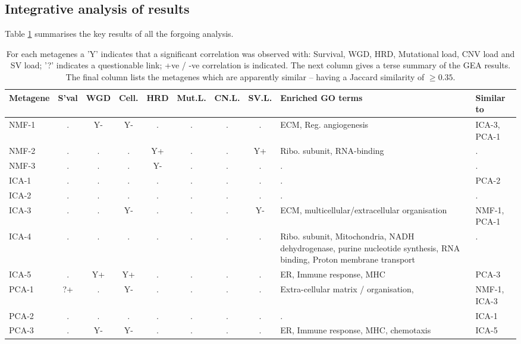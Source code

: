 \documentclass[tikz, 11pt,a4paper,oneside,fleqn]{article}
\begin{document}
\FloatBarrier

\subsection{Integrative analysis of results}
\label{sec-integrative-analysis}

Table \ref{tab-integrative-analysis} summarises the key results of all the forgoing analysis.  
 
\begin{table}[htb!]
\begin{center}
\begingroup
\scriptsize
\renewcommand{\arraystretch}{1.4} %
\begin{tabular}{|l||c|c|c|c|c|c|c|p{4.5cm}|l|}
\hline
Metagene & S'val & WGD & Cell. & HRD & Mut.L. & CN.L. & SV.L. & Enriched GO terms & Similar to\\
\hline
NMF-1 & . & Y-& Y-& . & . & . & . & ECM, Reg. angiogenesis & ICA-3, PCA-1 \\
NMF-2 & . & . & . & Y+& . & . & Y+& Ribo. subunit, RNA-binding & . \\
NMF-3 & . & . & . & Y-& . & . & . & . & . \\
\hline
ICA-1 & . & . & . & . & . & . & . & . & PCA-2 \\
ICA-2 & . & . & . & . & . & . & . & . & . \\
ICA-3 & . & . & Y-& . & . & . & Y-& ECM, multicellular/extracellular organisation & NMF-1, PCA-1 \\
ICA-4 & . & . & . & . & . & . & . & Ribo. subunit, Mitochondria, NADH dehydrogenase, purine nucleotide synthesis, RNA binding, Proton membrane transport & . \\
ICA-5 & . & Y+& Y+& . & . & . & . & ER, Immune response, MHC & PCA-3 \\
\hline
PCA-1 & ?+& . & Y-& . & . & . & . & Extra-cellular matrix / organisation, & NMF-1, ICA-3 \\
PCA-2 & . & . & . & . & . & . & . & . & ICA-1 \\
PCA-3 & . & Y-& Y-& . & . & . & . & ER, Immune response, MHC, chemotaxis & ICA-5 \\
\hline
\end{tabular}
\endgroup
\end{center}
\caption{For each metagenes a 'Y' indicates that a significant correlation was observed with: Survival, WGD, HRD, Mutational load,  CNV load and SV load;  '?' indicates a questionable link; +ve / -ve correlation is indicated.  The next column gives a terse summary of the GEA results.  The final column lists the metagenes which are apparently similar -- having a Jaccard similarity of $\geq 0.35$.}
\label{tab-integrative-analysis}
\end{table}
\end{document}
